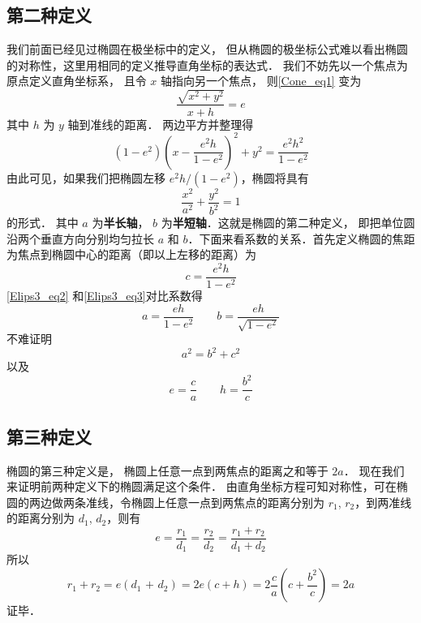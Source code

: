 

\subsection{第二种定义}
我们前面已经见过椭圆在极坐标中的定义， 但从椭圆的极坐标公式难以看出椭圆的对称性，这里用相同的定义推导直角坐标的表达式． 我们不妨先以一个焦点为原点定义直角坐标系， 且令 $x$ 轴指向另一个焦点， 则\autoref{Cone_eq1} 变为
\begin{equation}
\frac{{\sqrt {{x^2} + {y^2}} }}{{x + h}} = e
\end{equation}
其中 $h$ 为 $y$ 轴到准线的距离． 两边平方并整理得
\begin{equation}\label{Elips3_eq2}
(1 - {e^2}){\left( {x - \frac{{{e^2}h}}{{1 - {e^2}}}} \right)^2} + {y^2} = \frac{{{e^2}{h^2}}}{{1 - {e^2}}}
\end{equation}
由此可见，如果我们把椭圆左移 ${e^2}h/(1 - {e^2})$，椭圆将具有
\begin{equation}\label{Elips3_eq3}
\frac{{{x^2}}}{{{a^2}}} + \frac{{{y^2}}}{{{b^2}}} = 1
\end{equation}
的形式． 其中 $a$ 为\textbf{半长轴}， $b$ 为\textbf{半短轴}．这就是椭圆的第二种定义， 即把单位圆沿两个垂直方向分别均匀拉长 $a$ 和 $b$．下面来看系数的关系．首先定义椭圆的焦距为焦点到椭圆中心的距离（即以上左移的距离）为
\begin{equation}
c = \frac{{{e^2}h}}{{1 - {e^2}}}
\end{equation}
\autoref{Elips3_eq2} 和\autoref{Elips3_eq3}对比系数得
\begin{equation}
a = \frac{{eh}}{{1 - {e^2}}} \qquad b = \frac{{eh}}{{\sqrt {1 - {e^2}} }}
\end{equation}
不难证明
\begin{equation}
{a^2} = {b^2} + {c^2}
\end{equation}
以及
\begin{equation}
e = \frac{c}{a} \qquad h = \frac{{{b^2}}}{c}
\end{equation}

\subsection{第三种定义}
椭圆的第三种定义是， 椭圆上任意一点到两焦点的距离之和等于 $2a$． 现在我们来证明前两种定义下的椭圆满足这个条件． 由直角坐标方程可知对称性，可在椭圆的两边做两条准线，令椭圆上任意一点到两焦点的距离分别为 $r_1$, $r_2$，到两准线的距离分别为 $d_1$, $d_2$，则有
\begin{equation}
e = \frac{{{r_1}}}{{{d_1}}} = \frac{{{r_2}}}{{{d_2}}} = \frac{{{r_1} + {r_2}}}{{{d_1} + {d_2}}}
\end{equation}
所以
\begin{equation}
{r_1} + {r_2} = e({d_1}{\text{ + }}{d_2}) = 2e(c + h) = 2\frac{c}{a}\left( {c + \frac{{{b^2}}}{c}} \right) = 2a
\end{equation}
证毕．
